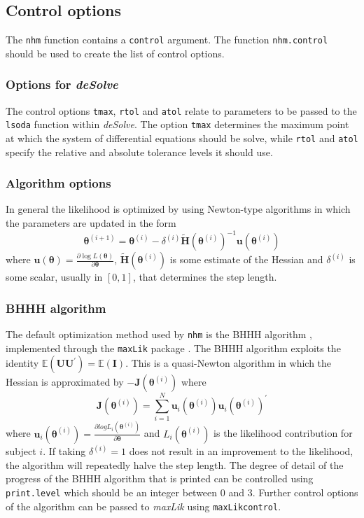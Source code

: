 \documentclass{article}
\numberwithin{equation}{section}
\begin{document}
\subsection{Control options}

The \verb!nhm! function contains a \verb!control! argument. The function \verb!nhm.control! should be used to create the list of control options.

\subsubsection{Options for \it{deSolve}}

The control options \verb!tmax!, \verb!rtol!  and \verb!atol! relate to parameters to be passed to the \verb!lsoda! function within {\it deSolve}. The option \verb!tmax! determines the maximum point at which the system of differential equations should be solve, while \verb!rtol! and \verb!atol! specify the relative and absolute tolerance levels it should use.

\subsubsection{Algorithm options}

In general the likelihood is optimized by using Newton-type algorithms in which the parameters are updated in the form
$$\bm\theta^{(i+1)} = \bm\theta^{(i)} - \delta^{(i)} \mathbf{\tilde{H}}(\bm\theta^{(i)})^{-1}\mathbf{u}(\bm\theta^{(i)})$$
where $\mathbf{u}(\bm\theta) = \frac{\partial \log L(\bm\theta)}{\partial \bm\theta}$, $\mathbf{\tilde{H}}(\bm\theta^{(i)})$ is some estimate of the Hessian and $\delta^{(i)}$ is some scalar, usually in $[0,1]$, that determines the step length.

\subsubsection*{BHHH algorithm}

The default optimization method used by \verb!nhm! is the BHHH algorithm \cite{bhhh}, implemented through the \verb!maxLik! package \cite{maxLik}. The BHHH algorithm exploits the identity $\mathbb{E}(\mathbf{U}\mathbf{U}^{'}) = \mathbb{E}(\mathbf{I})$. This is a quasi-Newton algorithm in which the Hessian is approximated by $-\mathbf{J}(\bm\theta^{(i)})$ where
$$\mathbf{J}(\bm\theta^{(i)}) = \sum_{i=1}^{N} \mathbf{u}_i(\bm\theta^{(i)}) \mathbf{u}_i(\bm\theta^{(i)})^{'}$$
where $\mathbf{u}_i(\bm\theta^{(i)}) = \frac{\partial log L_i(\bm\theta^{(i)})}{\partial \bm\theta}$ and $L_i(\bm\theta^{(i)})$ is the likelihood contribution for subject $i$. If taking $\delta^{(i)} = 1$ does not result in an improvement to the likelihood, the algorithm will repeatedly halve the step length. The degree of detail of the progress of the BHHH algorithm that is printed can be controlled using \verb!print.level! which should be an integer between 0 and 3. Further control options of the algorithm can be passed to {\it maxLik} using \verb!maxLikcontrol!.
\end{document}

